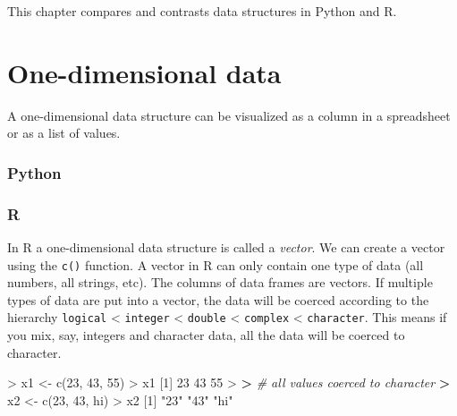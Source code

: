 \documentclass[
]{book}
\newenvironment{Shaded}{\begin{snugshade}}{\end{snugshade}}
\newcommand{\CommentTok}[1]{\textcolor[rgb]{0.56,0.35,0.01}{\textit{#1}}}
\newcommand{\DecValTok}[1]{\textcolor[rgb]{0.00,0.00,0.81}{#1}}
\newcommand{\ErrorTok}[1]{\textcolor[rgb]{0.64,0.00,0.00}{\textbf{#1}}}
\newcommand{\FunctionTok}[1]{\textcolor[rgb]{0.00,0.00,0.00}{#1}}
\newcommand{\NormalTok}[1]{#1}
\newcommand{\OtherTok}[1]{\textcolor[rgb]{0.56,0.35,0.01}{#1}}
\newcommand{\SpecialCharTok}[1]{\textcolor[rgb]{0.00,0.00,0.00}{#1}}
\newcommand{\StringTok}[1]{\textcolor[rgb]{0.31,0.60,0.02}{#1}}
\begin{document}
This chapter compares and contrasts data structures in Python and R.

\hypertarget{one-dimensional-data}{%
\section{One-dimensional data}\label{one-dimensional-data}}

A one-dimensional data structure can be visualized as a column in a spreadsheet or as a list of values.

\hypertarget{python-7}{%
\subsubsection*{Python}\label{python-7}}

\hypertarget{r-7}{%
\subsubsection*{R}\label{r-7}}

In R a one-dimensional data structure is called a \emph{vector}. We can create a vector using the \texttt{c()} function. A vector in R can only contain one type of data (all numbers, all strings, etc). The columns of data frames are vectors. If multiple types of data are put into a vector, the data will be coerced according to the hierarchy \texttt{logical} \textless{} \texttt{integer} \textless{} \texttt{double} \textless{} \texttt{complex} \textless{} \texttt{character}. This means if you mix, say, integers and character data, all the data will be coerced to character.

\begin{Shaded}
\begin{Highlighting}[]
\SpecialCharTok{\textgreater{}}\NormalTok{ x1 }\OtherTok{\textless{}{-}} \FunctionTok{c}\NormalTok{(}\DecValTok{23}\NormalTok{, }\DecValTok{43}\NormalTok{, }\DecValTok{55}\NormalTok{)}
\SpecialCharTok{\textgreater{}}\NormalTok{ x1}
\NormalTok{[}\DecValTok{1}\NormalTok{] }\DecValTok{23} \DecValTok{43} \DecValTok{55}
\SpecialCharTok{\textgreater{}} 
\ErrorTok{\textgreater{}} \CommentTok{\# all values coerced to character}
\ErrorTok{\textgreater{}}\NormalTok{ x2 }\OtherTok{\textless{}{-}} \FunctionTok{c}\NormalTok{(}\DecValTok{23}\NormalTok{, }\DecValTok{43}\NormalTok{, }\StringTok{\textquotesingle{}hi\textquotesingle{}}\NormalTok{)}
\SpecialCharTok{\textgreater{}}\NormalTok{ x2}
\NormalTok{[}\DecValTok{1}\NormalTok{] }\StringTok{"23"} \StringTok{"43"} \StringTok{"hi"}
\end{Highlighting}
\end{Shaded}
\end{document}

